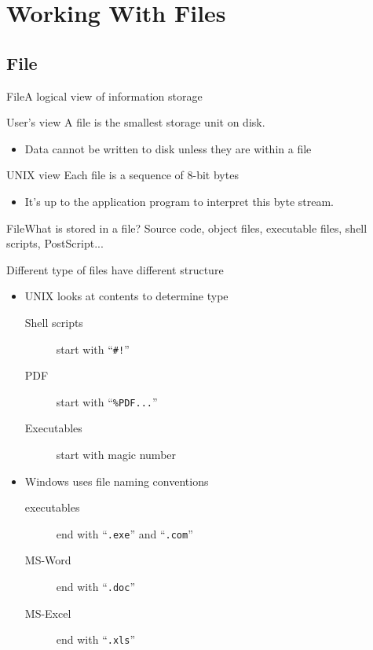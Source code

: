 \section{Working With Files}
\label{sec:working-with-files}

\subsection{File}
\label{sec:file}

\begin{frame}{File}{A logical view of information storage}
  \begin{block}{User's view}
    A file is the smallest storage unit on disk.
    \begin{itemize}
    \item Data cannot be written to disk unless they are within a file
    \end{itemize}
  \end{block}
  \begin{block}{UNIX view}
    Each file is a sequence of 8-bit bytes
    \begin{itemize}
    \item It's up to the application program to interpret this byte stream.
    \end{itemize}
  \end{block}
\end{frame}

\begin{frame}{File}{What is stored in a file?}
  Source code, object files, executable files, shell scripts, PostScript...
  \begin{block}{Different type of files have different structure}
    \begin{itemize}
    \item UNIX looks at contents to determine type
      \begin{description}
      \item[Shell scripts] start with ``\texttt{\#!}''
      \item[PDF] start with ``\texttt{\%PDF...}''
      \item[Executables] start with \alert{magic number}
      \end{description}
    \item Windows uses file naming conventions
      \begin{description}
      \item[executables] end with ``\texttt{.exe}'' and ``\texttt{.com}''
      \item[MS-Word] end with ``\texttt{.doc}''
      \item[MS-Excel] end with ``\texttt{.xls}''
      \end{description}
    \end{itemize}
  \end{block}
\end{frame}

